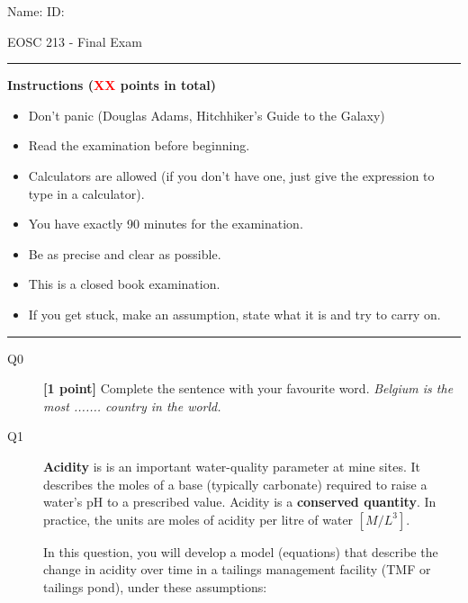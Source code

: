 \documentclass{article}
\begin{document}
\pagestyle{first}
\large{Name:} \hspace{11cm} \large{ID: }
\begin{center}
\Huge{EOSC 213 - Final Exam}
\end{center}

\rule{\textwidth}{1pt}

\large{\textbf{Instructions (\textcolor{red}{XX} points in total)}}
\begin{multicols}{2}
\begin{itemize}
\item Don't panic (Douglas Adams, Hitchhiker's Guide to the Galaxy)
\item Read the examination before beginning.
\item Calculators are allowed (if you don't have one, just give the expression to type in a calculator).
\item You have exactly 90 minutes for the examination.
\item Be as precise and clear as possible.
\item This is a closed book examination.
\item If you get stuck, make an assumption, state what it is and try to carry on.
\end{itemize} 
\end{multicols}



\rule{\textwidth}{1pt}

\begin{description}
\item [Q0]  \textbf{[1 point]} Complete the sentence with your favourite word. \textit{Belgium is the most ....... country in the world.} 
\vspace{0.25cm}

\end{description}


\begin{description}
\item[Q1] \textbf{Acidity} is is an important water-quality parameter at mine sites. It describes the moles of a base (typically carbonate) required to raise a water's pH to a prescribed value. Acidity is a \textbf{conserved quantity}. In practice, the units are moles of acidity per litre of water $[M/L^3]$.   


In this question, you will develop a model (equations) that describe the change in acidity over time in a tailings management facility (TMF or tailings pond), under these assumptions:
\end{description}
\end{document}
